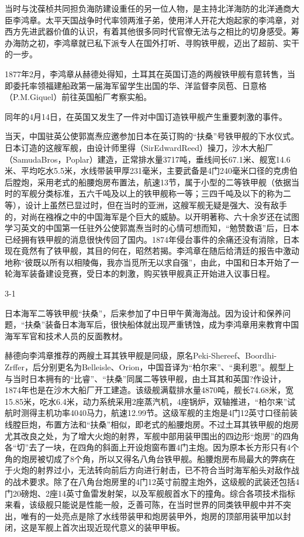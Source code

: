\documentclass[12pt,UTF8]{ctexbook}
\begin{document}
当时与沈葆桢共同担负海防建设重任的另一位人物，是主持北洋海防的北洋通商大臣李鸿章。太平天国战争时代率领两淮子弟，使用洋人开花大炮起家的李鸿章，对西方先进武器价值的认识，有着其他很多同时代官僚无法与之相比的切身感受。筹办海防之初，李鸿章就已私下派专人在国外打听、寻购铁甲舰，迈出了超前、实干的一步。

1877年2月，李鸿章从赫德处得知，土耳其在英国订造的两艘铁甲舰有意转售，当即委托率领福建船政第一届海军留学生出国的华、洋监督李凤苞、日意格（P.M.Giquel）前往英国船厂考察实船。

同年的4月14日，在英国又发生了一件对中国订造铁甲舰产生重要刺激的事件。

当天，中国驻英公使郭嵩焘应邀参加日本在英订购的“扶桑”号铁甲舰的下水仪式。日本订造的这艘军舰，由设计师里得（SirEdwardReed）操刀，沙木大船厂（SamudaBros，Poplar）建造，正常排水量3717吨，垂线间长67.1米、舰宽14.6米、平均吃水5.5米，水线带装甲厚231毫米，主要武备是4门240毫米口径的克虏伯后膛炮，采用老式的船腰炮房布置法，航速13节，属于小型的二等铁甲舰（依据当时的军舰分类标准，五六千吨及以上的铁甲舰称一等；三四千吨及以下的称为二等），设计上虽然已显过时，但在当时的亚洲，这艘军舰无疑是强大、没有敌手的，对尚在襁褓之中的中国海军是个巨大的威胁。以开明著称、六十余岁还在试图学习英文的中国第一任驻外公使郭嵩焘当时的心情可想而知，“勉赞数语”后，日本已经拥有铁甲舰的消息很快传回了国内。1874年侵台事件的余痛还没有消除，日本现在竟然有了铁甲舰，其目的何在，昭然若揭。李鸿章在随后给清廷的报告中激动地称“彼既以所有以相陵侮，我亦当觅所无以求自强”，由此，中国和日本开始了一轮海军装备建设竞赛，受日本的刺激，购买铁甲舰真正开始进入议事日程。

3-1

日本海军二等铁甲舰“扶桑”，后来参加了中日甲午黄海海战。因为设计和保养问题，“扶桑”装备日本海军后，很快船体就出现严重锈蚀，成为李鸿章用来教育中国海军军官和技术人员的反面教材。

赫德向李鸿章推荐的两艘土耳其铁甲舰是同级，原名Peki-Shereef、Boordhi-Zrffer，后分别更名为Belleisle、Orion，中国音译为“柏尔来”、“奥利恩”。舰型上与当时日本拥有的“比睿”、“扶桑”同属二等铁甲舰，由土耳其和英国?作设计，1874年也是在沙木大船厂开工建造。该级舰满载排水量4870吨，舰长74.68米，宽15.85米，吃水6.4米，动力系统采用2座蒸汽机，4座锅炉，双轴推进，“柏尔来”试航时测得主机功率4040马力，航速12.99节。这级军舰的主炮是4门12英寸口径前装线膛巨炮，布置方法和“扶桑”相似，即老式的船腰炮房。不过土耳其铁甲舰的炮房尤其改良之处，为了增大火炮的射界，军舰中部用装甲围出的四边形“炮房”的四角各“切”去了一块，在四角的斜面上开设炮窗布置4门主炮。因为原本长方形只有4个角的炮房被切成了8个角，所以又得名八角台铁甲舰。船腰炮房布局最大的弊病在于火炮的射界过小，无法转向前后方向进行射击，已不符合当时海军船头对敌作战的战术要求。除了在八角台炮房里的4门12英寸前膛主炮外，这级舰的武装还包括4门20磅炮、2座14英寸鱼雷发射架，以及军舰舰首水下的撞角。综合各项技术指标来看，该级舰只能说是性能一般，乏善可陈，在当时世界的同类铁甲舰中并不突出，唯有的一处亮点是除了水线带装甲和炮房装甲外，炮房的顶部用装甲加以封闭，这是军舰上首次出现近现代意义的装甲甲板。
\end{document}
